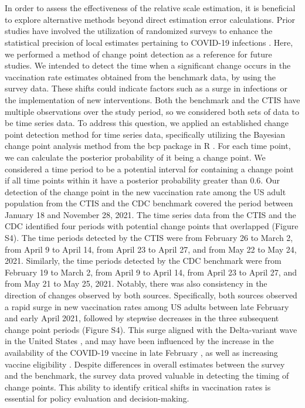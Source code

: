 \documentclass{article}
\begin{document}
\\
\\
In order to assess the effectiveness of the relative scale estimation, it is beneficial to explore alternative methods beyond direct estimation error calculations. Prior studies have involved the utilization of randomized surveys to enhance the statistical precision of local estimates pertaining to COVID-19 infections \citep{Nicholson2022-gj}. Here, we performed a method of change point detection as a reference for future studies. We intended to detect the time when a significant change occurs in the vaccination rate estimates obtained from the benchmark data, by using the survey data. These shifts could indicate factors such as a surge in infections or the implementation of new interventions. Both the benchmark and the CTIS have multiple observations over the study period, so we considered both sets of data to be time series data. To address this question, we applied an established change point detection method for time series data, specifically utilizing the Bayesian change point analysis method from the bcp package in R \citep{Wang2015}. For each time point, we can calculate the posterior probability of it being a change point. We considered a time period to be a potential interval for containing a change point if all time points within it have a posterior probability greater than 0.6. Our detection of the change point in the new vaccination rate among the US adult population from the CTIS and the CDC benchmark covered the period between January 18 and November 28, 2021. The time series data from the CTIS and the CDC identified four periods with potential change points that overlapped (Figure S4). The time periods detected by the CTIS were from February 26 to March 2, from April 9 to April 14, from April 23 to April 27, and from May 22 to May 24, 2021. Similarly, the time periods detected by the CDC benchmark were from February 19 to March 2, from April 9 to April 14, from April 23 to April 27, and from May 21 to May 25, 2021. Notably, there was also consistency in the direction of changes observed by both sources. Specifically, both sources observed a rapid surge in new vaccination rates among US adults between late February and early April 2021, followed by stepwise decreases in the three subsequent change point periods (Figure S4). This surge aligned with the Delta-variant wave in the United States \citep{Diesel2021-ls}, and may have been influenced by the increase in the availability of the COVID-19 vaccine in late February \citep{fda-eua-20210227}, as well as increasing vaccine eligibility \citep{ourworldindata-2023}. Despite differences in overall estimates between the survey and the benchmark, the survey data proved valuable in detecting the timing of change points. This ability to identify critical shifts in vaccination rates is essential for policy evaluation and decision-making. 
\end{document}
